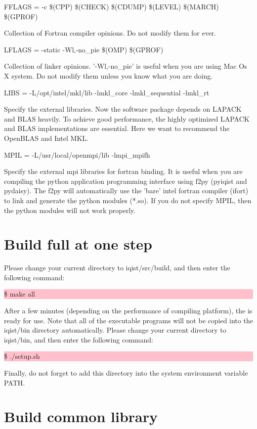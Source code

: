 {\color{red}FFLAGS = -c \$(CPP) \$(CHECK) \$(CDUMP) \$(LEVEL) \$(MARCH) \$(GPROF)}

Collection of Fortran compiler opinions. Do not modify them for ever.

{\color{red}LFLAGS = -static -Wl,-no\_pie \$(OMP) \$(GPROF)}

Collection of linker opinions. '-Wl,-no\_pie' is useful when you are using Mac Os X system. Do not modify them unless you know what you are doing.

{\color{red}LIBS   = -L/opt/intel/mkl/lib -lmkl\_core -lmkl\_sequential -lmkl\_rt}

Specify the external libraries. Now the {\iqist} software package depends on LAPACK and BLAS heavily. To achieve good performance, the highly optimized LAPACK and BLAS implementations are essential. Here we want to recommend the OpenBLAS and Intel MKL.

{\color{red}MPIL   = -L/usr/local/openmpi/lib -lmpi\_mpifh}

Specify the external mpi libraries for fortran binding. It is useful when you are compiling the python application programming interface using f2py (pyiqist and pydaisy). The f2py will automatically use the 'bare' intel fortran compiler (ifort) to link and generate the python modules (*.so). If you do not specify MPIL, then the python modules will not work properly. 

\section{Build full {\iqist} at one step}
Please change your current directory to iqist/src/build, and then enter the following command:

\noindent\colorbox{pink}{\parbox[r]{\linewidth}{\quad \$ make all}}

After a few minutes (depending on the performance of compiling platform), the {\iqist} is ready for use. Note that all of the executable programs will not be copied into the iqist/bin directory automatically. Please change your current directory to iqist/bin, and then enter the following command:

\noindent\colorbox{pink}{\parbox[r]{\linewidth}{\quad \$ ./setup.sh}}

Finally, do not forget to add this directory into the system environment variable PATH.

\section{Build common library}

